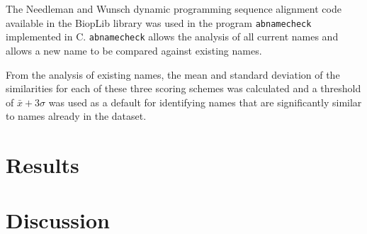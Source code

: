 \documentclass{article}
\begin{document}
The Needleman and Wunsch dynamic programming sequence alignment code
available in the BiopLib\cite{porter:bioplib} library was used in the
program \verb|abnamecheck| implemented in C. \verb|abnamecheck| allows
the analysis of all current names and allows a new name to be compared
against existing names.

From the analysis of existing names, the mean and standard deviation
of the similarities for each of these three scoring schemes was
calculated and a threshold of $\bar{x} + 3\sigma$ was used as a
default for identifying names that are significantly similar to names
already in the dataset.

\section{Results}

\section{Discussion}


\end{document}
